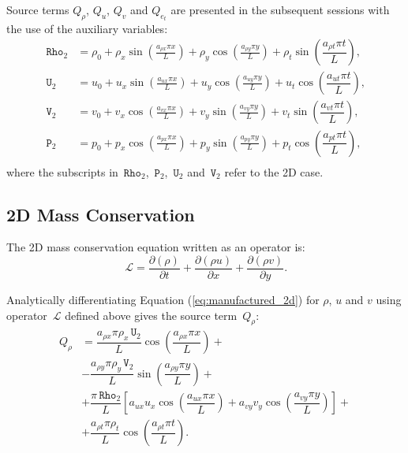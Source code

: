 \documentclass[10pt]{article}
\newcommand{\Diff}[2] {\dfrac{\partial( #1)}{\partial #2}}
\newcommand{\Rho}{\,\mathtt{Rho}}
\newcommand{\PP}{\,\mathtt{P}}
\newcommand{\U}{\,\mathtt{U}}
\newcommand{\V}{\,\mathtt{V}}
\newcommand{\Lo}{\,\mathcal{L}}
\begin{document}
Source terms $Q_\rho$, $Q_u$, $Q_v$ and $Q_{e_t}$ are presented in the subsequent sessions with the use of the auxiliary variables:
\begin{equation*}
 \begin{split}
\label{eq:aux_2d}
\Rho_2 &= \rho_{0}+ \rho_{x} \sin\left(\frac{a_{ \rho x} \pi x}{L}\right)+ \rho_{y} \cos\left(\frac{a_{ \rho y} \pi y}{L}\right)+ \rho_t \sin\left(\dfrac{a_{\rho t} \pi t}{L}\right),\\
\U_2 &= u_{0}+u_{x} \sin\left(\frac{a_{u x} \pi x}{L}\right)+u_{y} \cos\left(\frac{a_{u y} \pi y}{L}\right) + u_t \cos\left(\dfrac{a_{u t} \pi t}{L}\right),\\
\V_2 &= v_{0}+v_{x} \cos\left(\frac{a_{v x} \pi x}{L}\right)+v_{y} \sin\left(\frac{a_{v y} \pi y}{L}\right)+ v_t \sin\left(\dfrac{a_{v t} \pi t}{L}\right),\\
\PP_2 &= p_{0}+p_{x} \cos\left(\frac{a_{p x} \pi x}{L}\right)+p_{y} \sin\left(\frac{a_{p y} \pi y}{L}\right)+ p_t \cos\left(\dfrac{a_{p t} \pi t}{L}\right),\\
\end{split}
\end{equation*}
%
where the subscripts in $\Rho_2$, $\PP_2$, $\U_2$ and $\V_2$ refer to the 2D case.

\subsection{2D Mass Conservation}

The 2D mass conservation equation written as an operator is:
\begin{equation*}
  \Lo=\Diff{\rho }{t} +  \Diff{\rho u}{x}+\Diff{\rho v}{y}.
\end{equation*}

Analytically differentiating Equation (\ref{eq:manufactured_2d}) for $\rho$, $u$ and $v$ using operator $\Lo$ defined above gives  the source term~$Q_{\rho}$:
\begin{equation}
 \begin{split}
Q_\rho &= \dfrac{a_{\rho x} \pi \rho_x \U_2 }{L}\cos\left(\dfrac{a_{\rho x} \pi x}{L}\right)+\\
&-\dfrac{a_{\rho y} \pi \rho_y \V_2 }{L}\sin\left(\dfrac{a_{\rho y} \pi y}{L}\right)+\\
&+\dfrac{\pi \Rho_2}{L}\left[a_{ux} u_x \cos\left(\dfrac{a_{ux} \pi x}{L}\right)+a_{vy} v_y \cos\left(\dfrac{a_{vy} \pi y}{L}\right)\right] +\\
&+\dfrac{a_{\rho t} \pi \rho_t }{L}\cos\left(\dfrac{a_{\rho t} \pi t}{L}\right).
 \end{split}
\end{equation}
\end{document}
